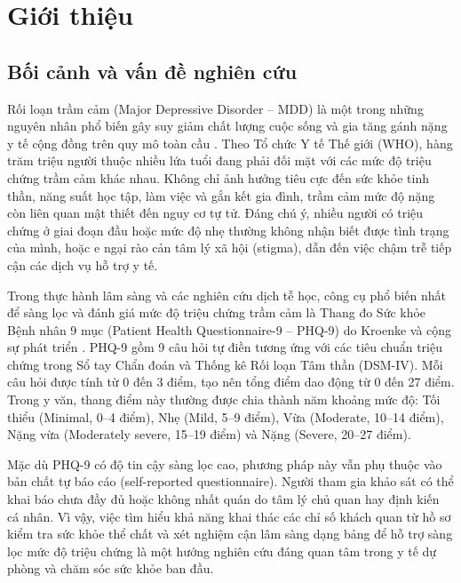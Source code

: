 \chapter{Giới thiệu}
\label{ch:gioi-thieu}

\section{Bối cảnh và vấn đề nghiên cứu}
\label{sec:boi-canh}

Rối loạn trầm cảm (Major Depressive Disorder -- MDD) là một trong những nguyên nhân phổ biến gây suy giảm chất lượng cuộc sống và gia tăng gánh nặng y tế cộng đồng trên quy mô toàn cầu \cite{pratt2014depression}. Theo Tổ chức Y tế Thế giới (WHO), hàng trăm triệu người thuộc nhiều lứa tuổi đang phải đối mặt với các mức độ triệu chứng trầm cảm khác nhau. Không chỉ ảnh hưởng tiêu cực đến sức khỏe tinh thần, năng suất học tập, làm việc và gắn kết gia đình, trầm cảm mức độ nặng còn liên quan mật thiết đến nguy cơ tự tử. Đáng chú ý, nhiều người có triệu chứng ở giai đoạn đầu hoặc mức độ nhẹ thường không nhận biết được tình trạng của mình, hoặc e ngại rào cản tâm lý xã hội (stigma), dẫn đến việc chậm trễ tiếp cận các dịch vụ hỗ trợ y tế.

Trong thực hành lâm sàng và các nghiên cứu dịch tễ học, công cụ phổ biến nhất để sàng lọc và đánh giá mức độ triệu chứng trầm cảm là Thang đo Sức khỏe Bệnh nhân 9 mục (Patient Health Questionnaire-9 -- PHQ-9) do Kroenke và cộng sự phát triển \cite{kroenke2001phq, spitzer1999validation}. PHQ-9 gồm 9 câu hỏi tự điền tương ứng với các tiêu chuẩn triệu chứng trong Sổ tay Chẩn đoán và Thống kê Rối loạn Tâm thần (DSM-IV). Mỗi câu hỏi được tính từ 0 đến 3 điểm, tạo nên tổng điểm dao động từ 0 đến 27 điểm. Trong y văn, thang điểm này thường được chia thành năm khoảng mức độ: Tối thiểu (Minimal, 0--4 điểm), Nhẹ (Mild, 5--9 điểm), Vừa (Moderate, 10--14 điểm), Nặng vừa (Moderately severe, 15--19 điểm) và Nặng (Severe, 20--27 điểm).

Mặc dù PHQ-9 có độ tin cậy sàng lọc cao, phương pháp này vẫn phụ thuộc vào bản chất tự báo cáo (self-reported questionnaire). Người tham gia khảo sát có thể khai báo chưa đầy đủ hoặc không nhất quán do tâm lý chủ quan hay định kiến cá nhân. Vì vậy, việc tìm hiểu khả năng khai thác các chỉ số khách quan từ hồ sơ kiểm tra sức khỏe thể chất và xét nghiệm cận lâm sàng dạng bảng để hỗ trợ sàng lọc mức độ triệu chứng là một hướng nghiên cứu đáng quan tâm trong y tế dự phòng và chăm sóc sức khỏe ban đầu.

